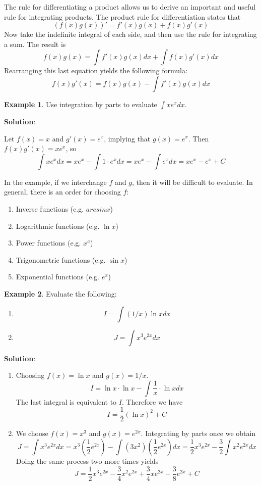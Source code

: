 \documentclass[10pt,a4paper]{book}
\theoremstyle{definition}\newtheorem{definition}{Definition}
\theoremstyle{definition}\newtheorem{fact}{Fact}
\theoremstyle{definition}\newtheorem{ex}{Ex.}
\theoremstyle{definition}\newtheorem{project}{Project}
\theoremstyle{definition}\newtheorem{problem}{Problem}
\theoremstyle{definition}\newtheorem{example}{Example}
\numberwithin{theorem}{chapter}
\numberwithin{corollary}{chapter}
\numberwithin{assumption}{chapter}
\numberwithin{definition}{chapter}
\numberwithin{prop}{chapter}
\numberwithin{notation}{chapter}
\numberwithin{problem}{chapter}
\numberwithin{example}{chapter}
\numberwithin{fact}{chapter}
\numberwithin{ex}{chapter}
\begin{document}
	The rule for differentiating a product allows us to derive an important and useful rule for integrating products. The product rule for differentiation states that
	$$ (f(x)g(x))' = f'(x)g(x) + f(x)g'(x)$$
	Now take the indefinite integral of each side, and then use the rule for integrating a sum. The result is
	$$f(x)g(x) = \int f'(x)g(x) dx + \int f(x)g'(x)dx $$
	Rearranging this last equation yields the following formula:
	$$f(x)g'(x) = f(x)g(x) - \int f'(x)g(x) dx $$
	
	\begin{example}
		Use integration by parts to evaluate $\int xe^x dx$.
		
		\textbf{Solution}:
		
		Let $f(x) = x$ and $g'(x) = e^x$, implying that $g(x) = e^x$. Then $f(x)g'(x) = xe^x$, so
		$$ \int xe^x dx = xe^x - \int 1\cdot e^x dx = xe^x - \int e^x dx = xe^x - e^x + C $$
	\end{example}
	
	In the example, if we interchange $f$ and $g$, then it will be difficult to evaluate. In general, there is an order for choosing $f$:
	\begin{enumerate}
		\item Inverse functions (e.g. $arcsinx$)
		\item Logarithmic functions (e.g. $\ln x$)
		\item Power functions (e.g. $x^a$)
		\item Trigonometric functions (e.g. $\sin x$)
		\item Exponential functions (e.g. $e^x$)
	\end{enumerate}
	
	\begin{example}
		Evaluate the following: 
		\begin{enumerate}[label=(\alph*)]
			\item $$I = \int (1/x)\ln x dx$$
			\item $$J = \int x^3 e^{2x} dx$$
		\end{enumerate}
		\textbf{Solution}:
		\begin{enumerate}[label=(\alph*)]
			\item Choosing $f(x) = \ln x$ and $g(x) = 1/x$.
			$$I = \ln x \cdot \ln x - \int \frac{1}{x} \cdot \ln x dx$$
			The last integral is equivalent to $I$. Therefore we have
			$$I = \frac{1}{2} (\ln x)^2 + C $$
			\item We choose $f(x) = x^3$ and $g(x) = e^{2x}$. Integrating by parts once we obtain
			$$J = \int x^3 e^{2x} dx = x^3 \left(\frac{1}{2}e^{2x} \right) - \int (3x^2) \left(\frac{1}{2}e^{2x} \right) dx = \frac{1}{2}x^3e^{2x} - \frac{3}{2}\int x^2 e^{2x}dx$$
			Doing the same process two more times yields
			$$J = \frac{1}{2}x^3 e^{2x} - \frac{3}{4}x^2 e^{2x} +\frac{3}{4}x e^{2x} - \frac{3}{8}e^{2x}+C$$
		\end{enumerate}
	\end{example}
	
\end{document}
